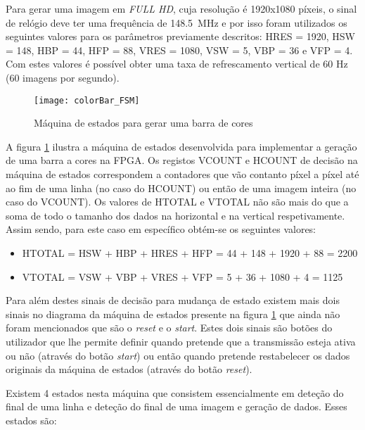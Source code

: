 Para gerar uma imagem em \textit{FULL HD}, cuja resolução é 1920x1080 píxeis, o sinal de relógio deve ter uma frequência de \SI{148.5}{\mega\hertz} e por isso foram utilizados os seguintes valores para os parâmetros previamente descritos: HRES = 1920, HSW = 148, HBP = 44, HFP = 88,  VRES = 1080, VSW = 5, VBP = 36 e VFP = 4. Com estes valores é possível obter uma taxa de refrescamento vertical de 60 Hz (60 imagens por segundo).

\begin{figure}[h!]
	\begin{center}
		\leavevmode
		\texttt{[image: colorBar\_FSM]}
		\caption{Máquina de estados para gerar uma barra de cores}
		\label{fig:colorBar_fsm}
	\end{center}
\end{figure}

A figura \ref{fig:colorBar_fsm} ilustra a máquina de estados desenvolvida para implementar a geração de uma barra a cores na FPGA. Os registos VCOUNT e HCOUNT de decisão na máquina de estados correspondem a contadores que vão contanto píxel a píxel até ao fim de uma linha (no caso do HCOUNT) ou então de uma imagem inteira (no caso do VCOUNT). Os valores de HTOTAL e VTOTAL não são mais do que a soma de todo o tamanho dos dados na horizontal e na vertical respetivamente. Assim sendo, para este caso em específico obtém-se os seguintes valores:
\begin{itemize}
	\item HTOTAL = HSW + HBP + HRES + HFP = 44 + 148 + 1920 + 88 = 2200
	\item VTOTAL = VSW + VBP + VRES + VFP = 5 + 36 + 1080 + 4 = 1125
\end{itemize}


Para além destes sinais de decisão para mudança de estado existem mais dois sinais no diagrama da máquina de estados presente na figura \ref{fig:colorBar_fsm} que ainda não foram mencionados que são o \textit{reset} e o \textit{start}. Estes dois sinais são botões do utilizador que lhe permite definir quando pretende que a transmissão esteja ativa ou não (através do botão \textit{start}) ou então quando pretende restabelecer os dados originais da máquina de estados (através do botão \textit{reset}). 


Existem 4 estados nesta máquina que consistem essencialmente em deteção do final de uma linha e deteção do final de uma imagem e geração de dados. Esses estados são:

